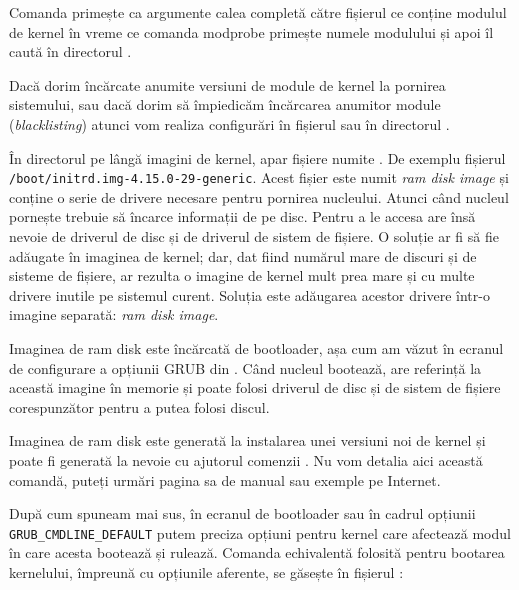 Comanda  primește ca argumente calea completă către fișierul ce conține
modulul de kernel în vreme ce comanda modprobe primește numele modulului și apoi
îl caută în directorul .

Dacă dorim încărcate anumite versiuni de module de kernel la pornirea
sistemului, sau dacă dorim să împiedicăm încărcarea anumitor module
(\textit{blacklisting}) atunci vom realiza configurări în fișierul  sau în
directorul .

În directorul  pe lângă imagini de kernel, apar fișiere numite
. De exemplu fișierul \texttt{/boot/initrd.img-4.15.0-29-generic}.
Acest fișier este numit \textit{ram disk image} și conține o serie de drivere
necesare pentru pornirea nucleului. Atunci când nucleul pornește trebuie să
încarce informații de pe disc. Pentru a le accesa are însă nevoie de driverul de
disc și de driverul de sistem de fișiere. O soluție ar fi să fie adăugate în
imaginea de kernel; dar, dat fiind numărul mare de discuri și de sisteme de
fișiere, ar rezulta o imagine de kernel mult prea mare și cu multe drivere
inutile pe sistemul curent. Soluția este adăugarea acestor drivere într-o
imagine separată: \textit{ram disk image}.

Imaginea de ram disk este încărcată de bootloader, așa cum am văzut în ecranul
de configurare a opțiunii GRUB din . Când nucleul
bootează, are referință la această imagine în memorie și poate folosi driverul de
disc și de sistem de fișiere corespunzător pentru a putea folosi discul.

Imaginea de ram disk este generată la instalarea unei versiuni noi de kernel și
poate fi generată la nevoie cu ajutorul comenzii . Nu vom detalia
aici această comandă, puteți urmări pagina sa de manual sau exemple pe Internet.

După cum spuneam mai sus, în ecranul de bootloader sau în cadrul opțiunii
\texttt{GRUB\_CMDLINE\_DEFAULT} putem preciza opțiuni pentru kernel care afectează modul în
care acesta bootează și rulează. Comanda echivalentă folosită pentru bootarea
kernelului, împreună cu opțiunile aferente, se găsește în fișierul
:


